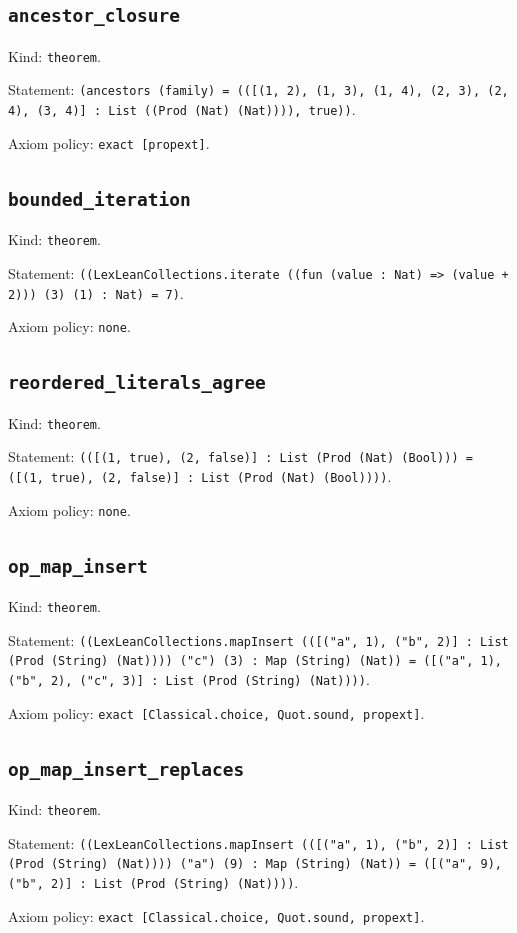 \documentclass[11pt]{article}
\begin{document}
\subsection*{\texttt{ancestor\_closure}}
\noindent Kind: \texttt{theorem}.\par
\noindent Statement: \texttt{(ancestors (family) = (([(1, 2), (1, 3), (1, 4), (2, 3), (2, 4), (3, 4)] : List ((Prod (Nat) (Nat)))), true))}.\par
\noindent Axiom policy: \texttt{exact [propext]}.\par
\subsection*{\texttt{bounded\_iteration}}
\noindent Kind: \texttt{theorem}.\par
\noindent Statement: \texttt{((LexLeanCollections.iterate ((fun (value : Nat) => (value + 2))) (3) (1) : Nat) = 7)}.\par
\noindent Axiom policy: \texttt{none}.\par
\subsection*{\texttt{reordered\_literals\_agree}}
\noindent Kind: \texttt{theorem}.\par
\noindent Statement: \texttt{(([(1, true), (2, false)] : List (Prod (Nat) (Bool))) = ([(1, true), (2, false)] : List (Prod (Nat) (Bool))))}.\par
\noindent Axiom policy: \texttt{none}.\par
\subsection*{\texttt{op\_map\_insert}}
\noindent Kind: \texttt{theorem}.\par
\noindent Statement: \texttt{((LexLeanCollections.mapInsert (([("a", 1), ("b", 2)] : List (Prod (String) (Nat)))) ("c") (3) : Map (String) (Nat)) = ([("a", 1), ("b", 2), ("c", 3)] : List (Prod (String) (Nat))))}.\par
\noindent Axiom policy: \texttt{exact [Classical.choice, Quot.sound, propext]}.\par
\subsection*{\texttt{op\_map\_insert\_replaces}}
\noindent Kind: \texttt{theorem}.\par
\noindent Statement: \texttt{((LexLeanCollections.mapInsert (([("a", 1), ("b", 2)] : List (Prod (String) (Nat)))) ("a") (9) : Map (String) (Nat)) = ([("a", 9), ("b", 2)] : List (Prod (String) (Nat))))}.\par
\noindent Axiom policy: \texttt{exact [Classical.choice, Quot.sound, propext]}.\par
\end{document}
